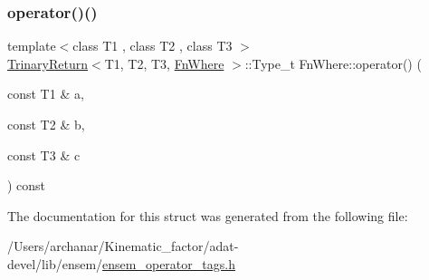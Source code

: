 \subsubsection{\texorpdfstring{operator()()}{operator()()}\hspace{0.1cm}{\footnotesize\ttfamily [3/3]}}
{\footnotesize\ttfamily template$<$class T1 , class T2 , class T3 $>$ \\
\mbox{\hyperlink{structTrinaryReturn}{Trinary\+Return}}$<$T1, T2, T3, \mbox{\hyperlink{structFnWhere}{Fn\+Where}} $>$\+::Type\+\_\+t Fn\+Where\+::operator() (\begin{DoxyParamCaption}\item[{const T1 \&}]{a,  }\item[{const T2 \&}]{b,  }\item[{const T3 \&}]{c }\end{DoxyParamCaption}) const\hspace{0.3cm}{\ttfamily [inline]}}



The documentation for this struct was generated from the following file\+:\begin{DoxyCompactItemize}
\item 
/\+Users/archanar/\+Kinematic\+\_\+factor/adat-\/devel/lib/ensem/\mbox{\hyperlink{adat-devel_2lib_2ensem_2ensem__operator__tags_8h}{ensem\+\_\+operator\+\_\+tags.\+h}}\end{DoxyCompactItemize}

